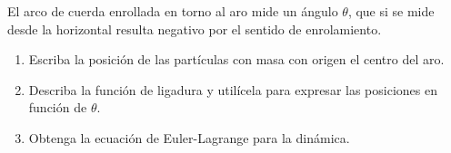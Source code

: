 \documentclass[11pt, spanish, a4paper, twoside]{article}
\begin{document}
\begin{enumerate}
\begin{minipage}[t][6cm]{0.55\textwidth}
		El arco de cuerda enrollada en torno al aro mide un ángulo \(\theta\), que si se mide desde la horizontal resulta negativo por el sentido de enrolamiento.
	\end{minipage}
	\begin{minipage}[c][2.5cm][t]{0.2\textwidth}
		
	\end{minipage}
	\begin{enumerate}
		\item Escriba la posición de las partículas con masa con origen el centro del aro.
		\item Describa la función de ligadura y utilícela para expresar las posiciones en función de \(\theta\).
		\item Obtenga la ecuación de Euler-Lagrange para la dinámica.\\
	\end{enumerate}



\end{enumerate}
\end{document}
